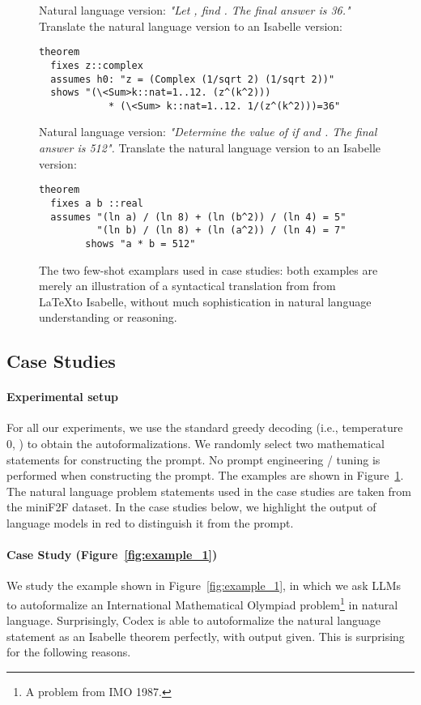 \documentclass{article}
\begin{document}
\begin{figure}
    \begin{boxB}
Natural language version:
\emph{"Let , find . The final answer is 36."} Translate the natural language version to an Isabelle version:
\begin{verbatim}
theorem
  fixes z::complex
  assumes h0: "z = (Complex (1/sqrt 2) (1/sqrt 2))"
  shows "(\<Sum>k::nat=1..12. (z^(k^2))) 
            * (\<Sum> k::nat=1..12. 1/(z^(k^2)))=36" 
\end{verbatim}


Natural language version:
\emph{"Determine the value of  if  and . The final answer is 512".}
Translate the natural language version to an Isabelle version:
\begin{verbatim}
theorem
  fixes a b ::real
  assumes "(ln a) / (ln 8) + (ln (b^2)) / (ln 4) = 5"
          "(ln b) / (ln 8) + (ln (a^2)) / (ln 4) = 7"
        shows "a * b = 512"
\end{verbatim}

\end{boxB}
    \caption{The two few-shot examplars used in case studies: both examples are merely an illustration of a syntactical translation from from \LaTeX to Isabelle, without much sophistication in natural language understanding or reasoning.}
    \label{fig:case_study_formal}
\end{figure}

\subsection{Case Studies}
\label{sec:case_study_formal}

\paragraph{Experimental setup} For all our experiments, we use the standard greedy decoding (i.e., temperature 0, ) to obtain the autoformalizations. We randomly select two mathematical statements for constructing the prompt. No prompt engineering / tuning is performed when constructing the prompt. The examples are shown in Figure~\ref{fig:case_study_formal}. The natural language problem statements used in the case studies are taken from the miniF2F dataset.
In the case studies below, we highlight the output of language models in red to distinguish it from the prompt.



\paragraph{Case Study  (Figure~\ref{fig:example_1})} We study the example shown in Figure~\ref{fig:example_1}, in which we ask LLMs to autoformalize an International Mathematical Olympiad problem\footnote{A problem from IMO 1987.} in natural language. Surprisingly, Codex is able to autoformalize the natural language statement as an Isabelle theorem perfectly, with output given. This is surprising for the following reasons.
\end{document}
